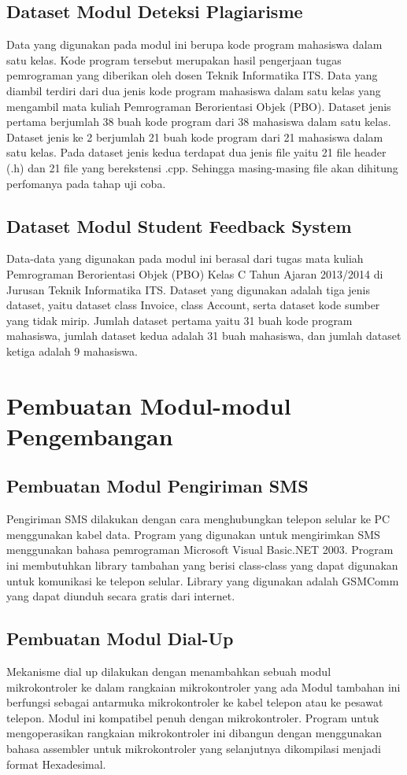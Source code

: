 \documentclass[12pt,a4paper]{article}
\begin{document}
\subsection{Dataset Modul Deteksi Plagiarisme}
Data yang digunakan pada modul ini berupa kode program mahasiswa dalam satu kelas. Kode program tersebut merupakan hasil pengerjaan tugas pemrograman yang diberikan oleh dosen Teknik Informatika ITS. Data yang diambil terdiri dari dua jenis kode program mahasiswa dalam satu kelas yang mengambil mata kuliah Pemrograman Berorientasi Objek (PBO). Dataset jenis pertama berjumlah 38 buah kode program dari 38 mahasiswa dalam satu kelas. Dataset jenis ke 2 berjumlah 21 buah kode program dari 21 mahasiswa dalam satu kelas. Pada dataset jenis kedua terdapat dua jenis file yaitu 21 file header (.h) dan 21 file yang berekstensi .cpp. Sehingga masing-masing file akan dihitung perfomanya pada tahap uji coba.
\subsection{Dataset Modul Student Feedback System}
Data-data yang digunakan pada modul ini berasal dari tugas mata kuliah Pemrograman Berorientasi Objek (PBO) Kelas C Tahun Ajaran 2013/2014 di Jurusan Teknik Informatika ITS. Dataset yang digunakan adalah tiga jenis dataset, yaitu dataset class Invoice, class Account, serta dataset kode sumber yang tidak mirip. Jumlah dataset pertama yaitu 31 buah kode program mahasiswa, jumlah dataset kedua adalah 31 buah mahasiswa, dan jumlah dataset ketiga adalah 9 mahasiswa.


\section{Pembuatan Modul-modul Pengembangan}
\subsection{Pembuatan Modul Pengiriman SMS}
Pengiriman SMS dilakukan dengan cara menghubungkan telepon selular ke PC menggunakan kabel data. 
Program yang digunakan untuk mengirimkan SMS menggunakan bahasa pemrograman Microsoft Visual Basic.NET 2003. Program ini membutuhkan library tambahan yang berisi class-class yang dapat digunakan untuk komunikasi ke telepon selular. Library yang digunakan adalah GSMComm yang dapat diunduh secara gratis dari internet. 
\subsection{Pembuatan Modul Dial-Up}
Mekanisme dial up dilakukan dengan menambahkan sebuah modul mikrokontroler ke dalam rangkaian mikrokontroler yang ada
Modul tambahan ini berfungsi sebagai antarmuka mikrokontroler ke kabel telepon atau ke pesawat telepon. Modul ini kompatibel penuh dengan mikrokontroler. 
Program untuk mengoperasikan rangkaian mikrokontroler ini dibangun dengan menggunakan bahasa assembler untuk mikrokontroler yang selanjutnya dikompilasi menjadi format Hexadesimal.
\end{document}
